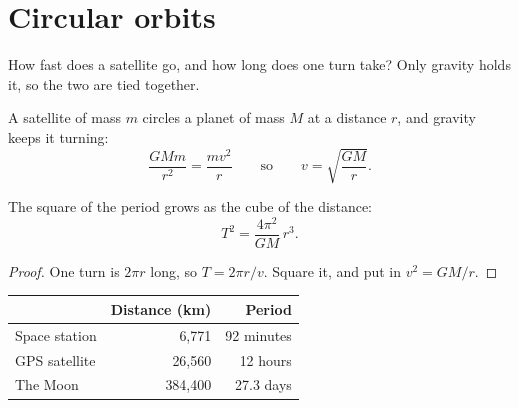 \section{Circular orbits}

How fast does a satellite go, and how long does one turn take? Only gravity holds it, so the two are tied together.

A satellite of mass $m$ circles a planet of mass $M$ at a distance $r$, and gravity keeps it turning:
\begin{equation}
  \frac{G M m}{r^2} = \frac{m v^2}{r}
  \qquad\text{so}\qquad
  v = \sqrt{\frac{G M}{r}} .
\end{equation}

\begin{theorem}
The square of the period grows as the cube of the distance:
\[ T^2 = \frac{4\pi^2}{G M}\, r^3 . \]
\end{theorem}

\begin{proof}
One turn is $2\pi r$ long, so $T = 2\pi r / v$. Square it, and put in $v^2 = G M / r$.
\end{proof}

\begin{tabular}{lrr}
  & Distance (km) & Period \\
  \hline
  Space station & 6,771 & 92 minutes \\
  GPS satellite & 26,560 & 12 hours \\
  The Moon & 384,400 & 27.3 days \\
\end{tabular}
